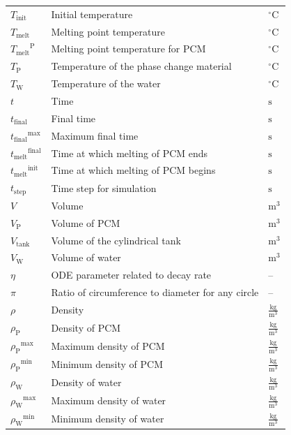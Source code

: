 \documentclass[12pt]{article}
\begin{document}
\begin{longtabu}{l X[l] l}
\\
${T_{\text{init}}}$ & Initial temperature & ${{}^{\circ}\text{C}}$
\\
${T_{\text{melt}}}$ & Melting point temperature & ${{}^{\circ}\text{C}}$
\\
${{T_{\text{melt}}}^{\text{P}}}$ & Melting point temperature for PCM & ${{}^{\circ}\text{C}}$
\\
${T_{\text{P}}}$ & Temperature of the phase change material & ${{}^{\circ}\text{C}}$
\\
${T_{\text{W}}}$ & Temperature of the water & ${{}^{\circ}\text{C}}$
\\
$t$ & Time & ${\text{s}}$
\\
${t_{\text{final}}}$ & Final time & ${\text{s}}$
\\
${{t_{\text{final}}}^{\text{max}}}$ & Maximum final time & ${\text{s}}$
\\
${{t_{\text{melt}}}^{\text{final}}}$ & Time at which melting of PCM ends & ${\text{s}}$
\\
${{t_{\text{melt}}}^{\text{init}}}$ & Time at which melting of PCM begins & ${\text{s}}$
\\
${t_{\text{step}}}$ & Time step for simulation & ${\text{s}}$
\\
$V$ & Volume & ${\text{m}^{3}}$
\\
${V_{\text{P}}}$ & Volume of PCM & ${\text{m}^{3}}$
\\
${V_{\text{tank}}}$ & Volume of the cylindrical tank & ${\text{m}^{3}}$
\\
${V_{\text{W}}}$ & Volume of water & ${\text{m}^{3}}$
\\
$η$ & ODE parameter related to decay rate & --
\\
$π$ & Ratio of circumference to diameter for any circle & --
\\
$ρ$ & Density & $\frac{\text{kg}}{\text{m}^{3}}$
\\
${ρ_{\text{P}}}$ & Density of PCM & $\frac{\text{kg}}{\text{m}^{3}}$
\\
${{ρ_{\text{P}}}^{\text{max}}}$ & Maximum density of PCM & $\frac{\text{kg}}{\text{m}^{3}}$
\\
${{ρ_{\text{P}}}^{\text{min}}}$ & Minimum density of PCM & $\frac{\text{kg}}{\text{m}^{3}}$
\\
${ρ_{\text{W}}}$ & Density of water & $\frac{\text{kg}}{\text{m}^{3}}$
\\
${{ρ_{\text{W}}}^{\text{max}}}$ & Maximum density of water & $\frac{\text{kg}}{\text{m}^{3}}$
\\
${{ρ_{\text{W}}}^{\text{min}}}$ & Minimum density of water & $\frac{\text{kg}}{\text{m}^{3}}$

\end{longtabu}
\end{document}
